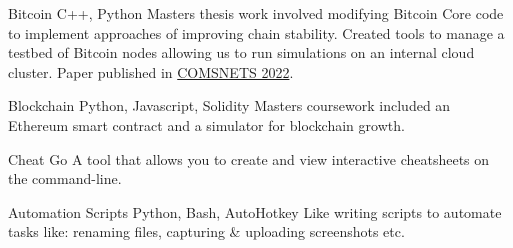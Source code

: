     {Bitcoin}
    {}
    {\scriptsize C++, Python}
    {}
    {
        Masters thesis work involved modifying Bitcoin Core code to implement approaches of improving chain stability.
        Created tools to manage a testbed of Bitcoin nodes allowing us to run simulations on an internal cloud cluster.
        Paper published in \href{https://dblp.org/pid/172/8850.html}{COMSNETS 2022}.
    }
    \vspace*{0.2\baselineskip}

    {Blockchain}
    {}
    {\scriptsize Python, Javascript, Solidity}
    {}
    {
        Masters coursework included
        an Ethereum smart contract %
        and a simulator for blockchain growth.
    }
    \vspace*{0.2\baselineskip}



\cventry{}
    {Cheat}
    {}
    {\scriptsize Go}
    {}
    {
        A tool that allows you to create and view interactive cheatsheets on the command-line.
    }
    \vspace*{0.2\baselineskip}


\cventry{}
    {Automation Scripts}
    {}
    {\scriptsize Python, Bash, AutoHotkey}
    {}
    {
        Like writing scripts to automate tasks like:
        renaming files,
        capturing \& uploading screenshots
        etc.
    }
    \vspace*{0.2\baselineskip}

